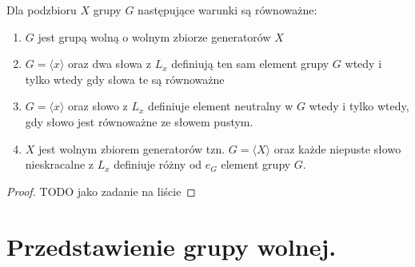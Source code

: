 \begin{theorem}
	Dla podzbioru $X$ grupy $G$ następujące warunki są równoważne:
	\begin{enumerate}[label=\arabic*)]
		\item $G$ jest grupą wolną o wolnym zbiorze generatorów $X$ 
		\item $G = \langle x \rangle $ oraz dwa słowa z $L_{x}$ definiują ten sam element grupy $G$ wtedy i tylko wtedy gdy słowa te są równoważne
		\item $G = \langle x \rangle $ oraz słowo z $L_{x}$ definiuje element neutralny w $G$ wtedy i tylko wtedy, gdy słowo jest równoważne ze słowem pustym.
		\item $X$ jest wolnym zbiorem generatorów tzn. $G = \langle X \rangle $ oraz każde niepuste słowo nieskracalne z $L_{x}$ definiuje różny od $e_{G}$ element grupy $G$.
	\end{enumerate}
\end{theorem} 
\begin{proof}
	TODO jako zadanie na liście
\end{proof} 
\section{Przedstawienie grupy wolnej.}

